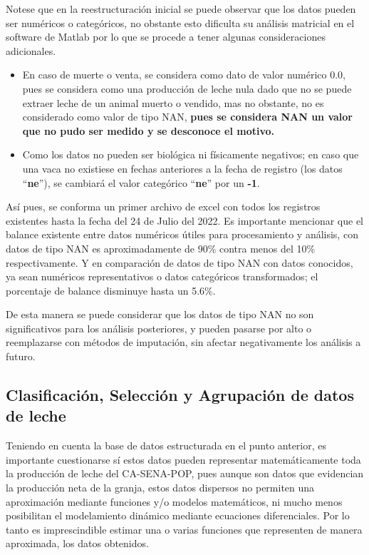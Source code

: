 Notese que en la reestructuración inicial se puede observar que los datos pueden ser numéricos o categóricos, no obstante esto dificulta su análisis matricial en el software de Matlab por lo que se procede a tener algunas consideraciones adicionales.

\begin{itemize}
    \item En caso de muerte o venta, se considera como dato de valor numérico 0.0, pues se considera como una producción de leche nula dado que no se puede extraer leche de un animal muerto o vendido, mas no obstante, no es considerado como valor de tipo NAN, \textbf{pues se considera NAN un valor que no pudo ser medido y se desconoce el motivo.}
    \item Como los datos no pueden ser biológica ni físicamente negativos; en caso que una vaca no existiese en fechas anteriores a la fecha de registro (los datos ``\textbf{ne}''), se cambiará el valor categórico ``\textbf{ne}'' por un \textbf{-1}.
\end{itemize}


Así pues, se conforma un primer archivo de excel con todos los registros existentes hasta la fecha del 24 de Julio del 2022. Es importante mencionar que el balance existente entre datos numéricos útiles para procesamiento y análisis, con datos de tipo NAN es  aproximadamente de 90\% contra menos del 10\% respectivamente. Y en comparación de datos de tipo NAN con datos conocidos, ya sean numéricos representativos o datos categóricos transformados; el porcentaje de balance disminuye hasta un 5.6\%.

De esta manera se puede considerar que los datos de tipo NAN no son significativos para los análisis posteriores, y pueden pasarse por alto o reemplazarse con métodos de imputación, sin afectar negativamente los análisis a futuro.

\pagebreak

\subsection{Clasificación, Selección y Agrupación de datos de leche}
Teniendo en cuenta la base de datos estructurada en el punto anterior, es importante cuestionarse sí estos datos pueden representar matemáticamente toda la producción de leche del CA-SENA-POP, pues aunque son datos que evidencian la producción neta de la granja, estos datos dispersos no permiten una aproximación mediante funciones y/o modelos matemáticos, ni mucho menos posibilitan el modelamiento dinámico mediante ecuaciones diferenciales. Por lo tanto es imprescindible estimar una o varias funciones que representen de manera aproximada, los datos obtenidos.

